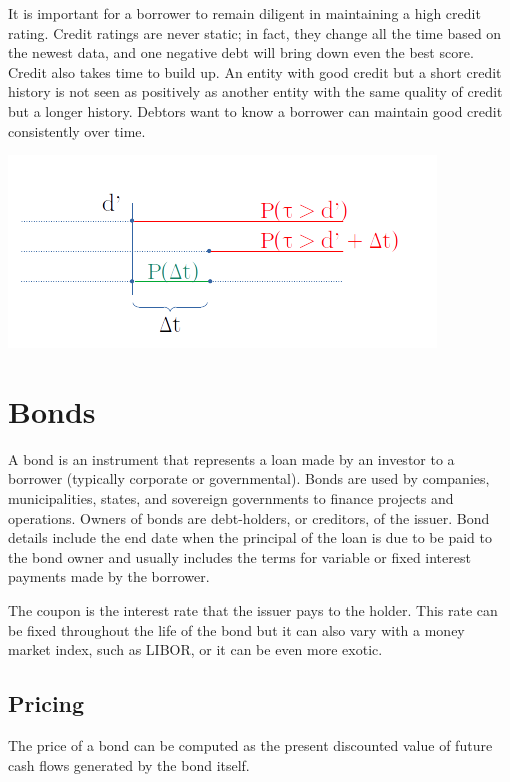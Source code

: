 It is important for a borrower to remain diligent in maintaining a high
credit rating. Credit ratings are never static; in fact, they change all
the time based on the newest data, and one negative debt will bring down
even the best score. Credit also takes time to build up. An entity with
good credit but a short credit history is not seen as positively as
another entity with the same quality of credit but a longer history.
Debtors want to know a borrower can maintain good credit consistently
over time.

\begin{center}
\includegraphics[width=0.75\linewidth]{timeline.png}
\end{center}

\section{Bonds}\label{bonds}

A bond is an instrument that represents a loan made by an investor to a
borrower (typically corporate or governmental). Bonds are used by
companies, municipalities, states, and sovereign governments to finance
projects and operations. Owners of bonds are debt-holders, or creditors,
of the issuer. Bond details include the end date when the principal of
the loan is due to be paid to the bond owner and usually includes the
terms for variable or fixed interest payments made by the borrower.

The coupon is the interest rate that the issuer pays to the holder.
This rate can be fixed throughout the life of the bond but it can also
vary with a money market index, such as LIBOR, or it can be even more
exotic.

\subsection{Pricing}\label{pricing}

The price of a bond can be computed as the present discounted value of
future cash flows generated by the bond itself.


